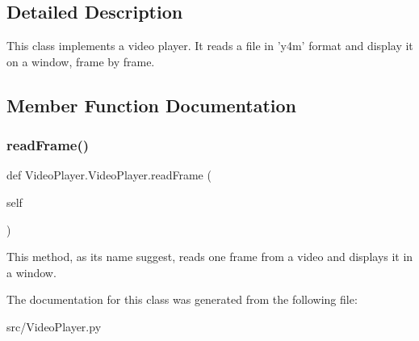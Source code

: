 \subsection{Detailed Description}
\begin{DoxyVerb}This class implements a video player.
It reads a file in 'y4m' format and display it on a window, frame by frame.
\end{DoxyVerb}
 

\subsection{Member Function Documentation}
\mbox{\label{classVideoPlayer_1_1VideoPlayer_a794fd22bd9237c8a5fea56aa85f9f878}} 
\subsubsection{\texorpdfstring{read\+Frame()}{readFrame()}}
{\footnotesize\ttfamily def Video\+Player.\+Video\+Player.\+read\+Frame (\begin{DoxyParamCaption}\item[{}]{self }\end{DoxyParamCaption})}

\begin{DoxyVerb}This method, as its name suggest, reads one frame from a video and displays it in a window.
\end{DoxyVerb}
 

The documentation for this class was generated from the following file\+:\begin{DoxyCompactItemize}
\item 
src/Video\+Player.\+py\end{DoxyCompactItemize}
